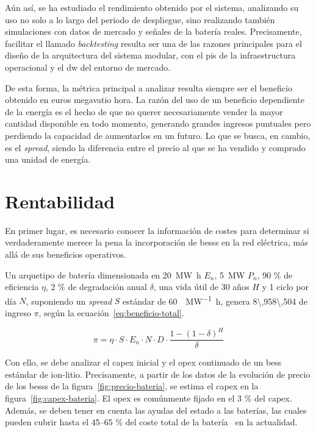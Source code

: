 Aún así, se ha estudiado el rendimiento obtenido por el sistema, analizando su uso no solo a lo largo del periodo de despliegue, sino realizando también simulaciones con datos de mercado y señales de la batería reales. Precisamente, facilitar el llamado \textit{backtesting} resulta ser una de las razones principales para el diseño de la arquitectura del sistema modular, con el \gls{pis} de la infraestructura operacional y el \gls{dw} del entorno de mercado.

De esta forma, la métrica principal a analizar resulta siempre ser el beneficio obtenido en euros megavatio hora. La razón del uso de un beneficio dependiente de la energía es el hecho de que no querer necesariamente vender la mayor cantidad disponible en todo momento, generando grandes ingresos puntuales pero perdiendo la capacidad de aumentarlos en un futuro. Lo que se busca, en cambio, es el \textit{spread}, siendo la diferencia entre el precio al que se ha vendido y comprado una unidad de energía.

\section{Rentabilidad}
\label{makereference7.1}

En primer lugar, es necesario conocer la información de costes para determinar si verdaderamente merece la pena la incorporación de \glspl{bess} en la red eléctrica, más allá de sus beneficios operativos.

Un arquetipo de batería dimensionada en \SI{20}{\mega\watt\hour} \( E_{n} \), \SI{5}{\mega\watt} \( P_{n} \), 90 \% de eficiencia \( \eta \), 2 \% de degradación anual \( \delta \), una vida útil de 30 años \( H \) y 1 ciclo por día \( N \), suponiendo un \textit{spread} \( S \) estándar de \SI{60}{\text{\euro}\per\mega\watt\hour}, genera \SI{8\,958\,504}{\text{\euro}} de ingreso \( \pi \), según la ecuación~\ref{eq:beneficio-total}.

\begin{equation}
  \label{eq:beneficio-total}
  \pi = \eta \cdot S \cdot E_{n} \cdot N \cdot D \cdot \frac{1 - (1 - \delta)^{H}}{\delta}
\end{equation}

Con ello, se debe analizar el \gls{capex} inicial y el \gls{opex} continuado de un \gls{bess} estándar de ion-litio. Precisamente, a partir de los datos de la evolución de precio de los \glspl{bess} de la figura~\ref{fig:precio-bateria}, se estima el \gls{capex} en la figura~\ref{fig:capex-bateria}. El \gls{opex} es comúnmente fijado en el 3 \% del \gls{capex}. Además, se deben tener en cuenta las ayudas del estado a las baterías, las cuales pueden cubrir hasta el 45--65 \% del coste total de la batería~\cite{solfy2025subvenciones} en la actualidad.

